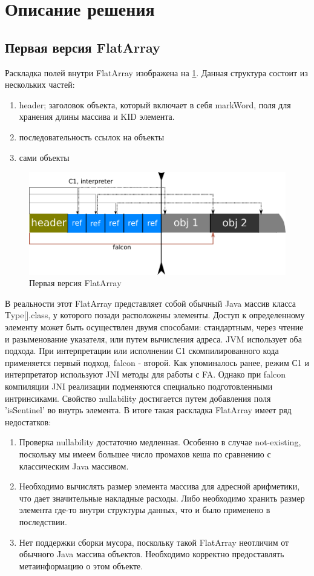 \section{Описание решения} \label{label-description}
\subsection{Первая версия FlatArray}
Раскладка полей внутри FlatArray изображена на \ref{first-fa}.
Данная структура состоит из нескольких частей:
\begin{enumerate}
	\item header; заголовок объекта, который включает в себя markWord, поля для хранения длины массива и KID элемента.
	\item последовательность ссылок на объекты
	\item сами объекты
\end{enumerate}
\begin{figure}[h]
	\caption{Первая версия FlatArray}\label{first-fa}
	\includegraphics[width=0.95\linewidth]{image/flatarray.png}
\end{figure}
В реальности этот FlatArray представляет собой обычный Java массив класса Type[].class, у которого позади расположены элементы. Доступ к определенному элементу может быть осуществлен двумя способами: стандартным, через чтение и разыменование указателя, или путем вычисления адреса. 
JVM использует оба подхода. При интерпретации или исполнении С1 скомпилированного кода применяется первый подход, falcon - второй. 
Как упоминалось ранее, режим С1 и интерпретатор используют JNI методы для работы с FA. Однако при falcon компиляции JNI реализации подменяются специально подготовленными интринсиками. 
Свойство nullability достигается путем добавления поля 'isSentinel' во внутрь элемента. 
В итоге такая раскладка FlatArray имеет ряд недостатков:
\begin{enumerate}
	\item Проверка nullability достаточно медленная. Особенно в случае not-existing, поскольку мы имеем большее число промахов кеша по сравнению с классическим Java массивом.
	\item Необходимо вычислять размер элемента массива для адресной арифметики, что дает значительные накладные расходы. Либо необходимо хранить размер элемента где-то внутри структуры данных, что и было применено в последствии.
	\item Нет поддержки сборки мусора, поскольку такой FlatArray неотличим от обычного Java массива объектов. 
	Необходимо корректно предоставлять метаинформацию о этом объекте. 
\end{enumerate}

